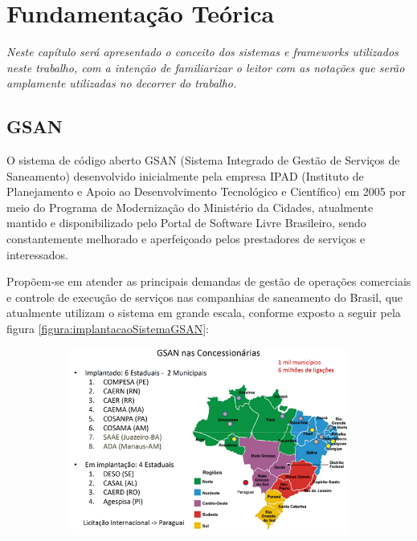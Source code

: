 \chapter[Fundamentação Teórica]{\textbf{F}undamentação \textbf{T}eórica}


\textit{Neste capítulo será apresentado o conceito dos sistemas e \textit{frameworks} utilizados neste trabalho, com a intenção de familiarizar o leitor com as notações que serão amplamente utilizadas no decorrer do trabalho.}

\section{GSAN}
O sistema de código aberto GSAN\label{key:GSAN-TEORIA} (Sistema Integrado de Gestão de Serviços de Saneamento) desenvolvido inicialmente pela empresa IPAD (Instituto de Planejamento e Apoio ao Desenvolvimento Tecnológico e Científico) em 2005 por meio do Programa de Modernização do Ministério da Cidades, atualmente mantido e disponibilizado pelo Portal de Software Livre Brasileiro, sendo constantemente melhorado e aperfeiçoado pelos prestadores de serviços e interessados. 

Propõem-se em atender as principais demandas de gestão de operações comerciais e controle de execução de serviços nas companhias de saneamento do Brasil, que atualmente utilizam o sistema em grande escala, conforme exposto a seguir pela figura \ref{figura:implantacaoSistemaGSAN}:


\begin{figure}[H]
	\centering
	\caption{Implantações do Sistema GSAN}	
	\label{figura:implantacaoSistemaGSAN}
	\begin{subfigure}[H]{\textwidth}
		\centering
		\includegraphics{figuras/implantacaoGSAN.png}
	\end{subfigure}
\end{figure}


